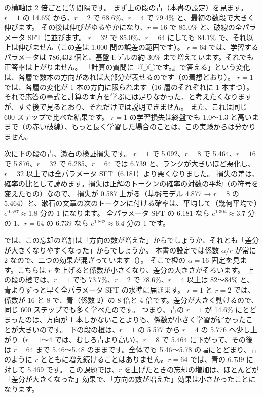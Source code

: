 の横軸は 2 倍ごとに等間隔です。
まず上の段の青（本書の設定）を見ます。
$r=1$ の 14.6\% から、$r=2$ で 68.6\%、$r=4$ で 79.4\% と、最初の数段で大きく伸びます。
その後は伸びがゆるやかになり、$r=16$ で 85.0\% と、破線の全パラメータ SFT に並びます。
$r=32$ で 85.0\%、$r=64$ にしても 84.1\% で、それ以上は伸びません（この差は 1,000 問の誤差の範囲です）。
$r=64$ では、学習するパラメータは 786,432 個と、基盤モデルの約 30\% まで増えています。それでも正答率は上がりません。
「計算の質問に『◯◯です。』で答える」という変化は、各層で数本の方向があれば大部分が表せるのです（の着想どおり）。
$r=1$ では、各層の変化が 1 本の方向に限られます（16 層のそれぞれに 1 本ずつ）。
それで応答の書式と計算の両方を学ぶには足りなかった、と考えたくなりますが、すぐ後で見るとおり、それだけでは説明できません。
また、これは同じ 600 ステップで比べた結果です。
$r=1$ の学習損失は終盤でも 1.0〜1.3 と高いままで（の赤い破線）、もっと長く学習した場合のことは、この実験からは分かりません。

次に下の段の青、漱石の検証損失です。
$r=1$ で 5.092、$r=8$ で 5.464、$r=16$ で 5.876、$r=32$ で 6.285、$r=64$ では 6.739 と、ランクが大きいほど悪化し、$r=32$ 以上では全パラメータ SFT（6.181）より悪くなりました。
損失の差は、確率の比として読めます。損失は正解のトークンの確率の対数の平均（の符号を変えたもの）なので、
損失が 0.587 上がる（基盤モデル 4.877 → $r=8$ の 5.464）と、漱石の文章の次のトークンに付ける確率は、平均して（幾何平均で）$e^{0.587}\approx1.8$ 分の 1 になります。
全パラメータ SFT の 6.181 なら $e^{1.304}\approx3.7$ 分の 1、$r=64$ の 6.739 なら $e^{1.862}\approx6.4$ 分の 1 です。

では、この忘却の増加は「方向の数が増えた」からでしょうか、それとも「差分が大きくなりやすくなった」からでしょうか。
本書の設定では係数 $\alpha/r$ が常に 2 なので、二つの効果が混ざっています（）。
そこで橙の $\alpha=16$ 固定を見ます。こちらは $r$ を上げると係数が小さくなり、差分の大きさがそろいます。
上の段の橙では、$r=1$ でも 73.7\%、$r=2$ で 78.6\%、$r=4$ 以上は 82〜84\% と、青よりずっと早く全パラメータ SFT の水準に届きます。
$r=1$ と $r=2$ では、係数が 16 と 8 で、青（係数 2）の 8 倍と 4 倍です。差分が大きく動けるので、同じ 600 ステップでも多く学べたのです。
つまり、青の $r=1$ が 14.6\% にとどまったのは、方向が 1 本しかないことよりも、係数が小さく学習が遅かったことが大きいのです。
下の段の橙は、$r=1$ の 5.577 から $r=4$ の 5.776 へ少し上がり（$r=1$〜4 では、むしろ青より高い）、$r=8$ で 5.464 に下がって、その後は $r=64$ まで 5.46〜5.48 のままです。全体でも 5.46〜5.78 の幅にとどまり、青のように $r$ とともに増え続けることはありません。$r=64$ では、青の 6.739 に対して 5.469 です。
この課題では、$r$ を上げたときの忘却の増加は、ほとんどが「差分が大きくなった」効果で、「方向の数が増えた」効果は小さかったことになります。

